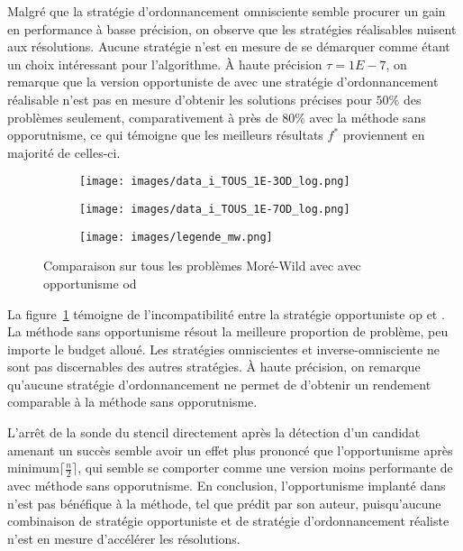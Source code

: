 Malgré que la stratégie d'ordonnancement omnisciente semble procurer un gain en performance à basse précision, on observe que les stratégies réalisables nuisent aux résolutions. Aucune stratégie n'est en mesure de se démarquer comme étant un choix intéressant pour l'algorithme. À haute précision $\tau = 1E-7$, on remarque que la version opportuniste de \imfil avec une stratégie d'ordonnancement réalisable n'est pas en mesure d'obtenir les solutions précises pour $50\%$ des problèmes seulement, comparativement à près de $80\%$ avec la méthode sans opporutnisme, ce qui témoigne que les meilleurs résultats $f^*$ proviennent en majorité de celles-ci.
\begin{figure}[!htb]
	\centering
	\begin{subfigure}{0.43\textwidth}
		\texttt{[image: images/data\_i\_TOUS\_1E-3OD\_log.png]}
	\end{subfigure}
	\begin{subfigure}{0.43\textwidth}
		\texttt{[image: images/data\_i\_TOUS\_1E-7OD\_log.png]}
	\end{subfigure}
	\smallskip
	\begin{subfigure}{0.95\textwidth}
		\texttt{[image: images/legende\_mw.png]}
	\end{subfigure}
	\caption{Comparaison sur tous les problèmes Moré-Wild avec \imfil avec opportunisme \textsf{od}}
	\label{fig:i_mw_od}
\end{figure}
La figure~\ref{fig:i_mw_od} témoigne de l'incompatibilité entre la stratégie opportuniste \textsf{op} et \imfil. La méthode sans opportunisme résout la meilleure proportion de problème, peu importe le budget alloué. Les stratégies omniscientes et inverse-omnisciente ne sont pas discernables des autres stratégies. À haute précision, on remarque qu'aucune stratégie d'ordonnancement ne permet de d'obtenir un rendement comparable à la méthode sans opporutnisme.

L'arrêt de la sonde du stencil directement après la détection d'un candidat amenant un succès semble avoir un effet plus prononcé que l'opportunisme après minimum$\lceil \frac{n}{2}\rceil$, qui semble se comporter comme une version moins performante de \imfil avec méthode sans opporutnisme. En conclusion, l'opportunisme implanté dans \imfil n'est pas bénéfique à la méthode, tel que prédit par son auteur, puisqu'aucune combinaison de stratégie opportuniste et de stratégie d'ordonnancement réaliste n'est en mesure d'accélérer les résolutions.
